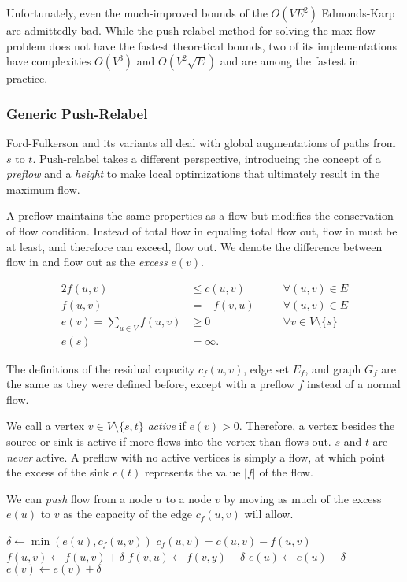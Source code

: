 Unfortunately, even the much-improved bounds of the $O(VE^2)$ Edmonds-Karp are admittedly bad. While the push-relabel method for solving the max flow problem does not have the fastest theoretical bounds, two of its implementations have complexities $O(V^3)$ and $O(V^2\sqrt{E})$ and are among the fastest in practice.

\subsubsection{Generic Push-Relabel}

Ford-Fulkerson and its variants all deal with global augmentations of paths from $s$ to $t$. Push-relabel takes a different perspective, introducing the concept of a \textit{preflow} and a \textit{height} to make local optimizations that ultimately result in the maximum flow.

A preflow maintains the same properties as a flow but modifies the conservation of flow condition. Instead of total flow in equaling total flow out, flow in must be at least, and therefore can exceed, flow out. We denote the difference between flow in and flow out as the \textit{excess} $e(v)$.

\begin{alignat*}{2}
f(u,v) &\le c(u,v)   \quad && \forall (u,v) \in E \\
f(u,v) &= -f(v,u)   \quad && \forall (u,v) \in E \\
e(v) = \sum_{u \in V} f(u,v) &\ge 0   \quad && \forall v \in V \setminus \{s\} \\
e(s) &= \infty. \quad &&
\end{alignat*}

The definitions of the residual capacity $c_f(u,v)$, edge set $E_f$, and graph $G_f$ are the same as they were defined before, except with a preflow $f$ instead of a normal flow.

We call a vertex $v \in V \setminus \{s, t\}$ \textit{active} if $e(v) > 0$. Therefore, a vertex besides the source or sink is active if more flows into the vertex than flows out. $s$ and $t$ are \textit{never} active. A preflow with no active vertices is simply a flow, at which point the excess of the sink $e(t)$ represents the value $|f|$ of the flow.

We can \textit{push} flow from a node $u$ to a node $v$ by moving as much of the excess $e(u)$ to $v$ as the capacity of the edge $c_f(u,v)$ will allow.

\noindent \begin{minipage}{\textwidth}
\begin{algorithmic}
	\State $\delta \gets \min(e(u), c_f(u,v))$
	\Comment $c_f(u,v) = c(u,v) - f(u,v)$
	\State $f(u,v) \gets f(u,v) + \delta$
	\State $f(v,u) \gets f(v,y) - \delta$
	\State $e(u) \gets e(u) - \delta$
	\State $e(v) \gets e(v) + \delta$
\EndFunction
\end{algorithmic}
\end{minipage}

